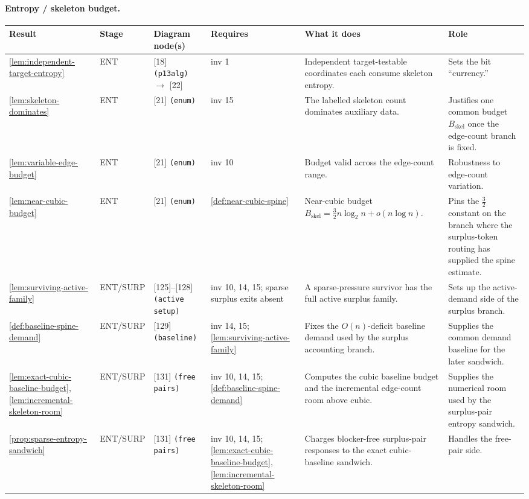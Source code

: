 \documentclass[11pt]{article}
\begin{document}
\paragraph{Entropy / skeleton budget.}
{\scriptsize\setlength{\tabcolsep}{3pt}
\begin{longtable}{L{0.10\textwidth} C{0.045\textwidth} L{0.13\textwidth} L{0.135\textwidth} L{0.28\textwidth} L{0.20\textwidth}}
\toprule
\textbf{Result} & \textbf{Stage} & \textbf{Diagram node(s)} & \textbf{Requires} & \textbf{What it does} & \textbf{Role} \\
\midrule
\endhead
\cref{lem:independent-target-entropy} & ENT & [18] \texttt{(p13alg)} $\to$ [22] & inv 1 & Independent target-testable coordinates each consume skeleton entropy. & Sets the bit ``currency.'' \\
\cref{lem:skeleton-dominates} & ENT & [21] \texttt{(enum)} & inv 15 & The labelled skeleton count dominates auxiliary data. & Justifies one common budget $B_{\mathrm{skel}}$ once the edge-count branch is fixed. \\
\cref{lem:variable-edge-budget} & ENT & [21] \texttt{(enum)} & inv 10 & Budget valid across the edge-count range. & Robustness to edge-count variation. \\
\cref{lem:near-cubic-budget} & ENT & [21] \texttt{(enum)} & \cref{def:near-cubic-spine} & Near-cubic budget $B_{\mathrm{skel}}=\tfrac32 n\log_2 n+o(n\log n)$. & Pins the $\tfrac32$ constant on the branch where the surplus-token routing has supplied the spine estimate. \\
\cref{lem:surviving-active-family} & ENT\slash SURP & [125]--[128] \texttt{(active setup)} & inv 10, 14, 15; sparse surplus exits absent & A sparse-pressure survivor has the full active surplus family. & Sets up the active-demand side of the surplus branch. \\
\cref{def:baseline-spine-demand} & ENT\slash SURP & [129] \texttt{(baseline)} & inv 14, 15; \cref{lem:surviving-active-family} & Fixes the \(O(n)\)-deficit baseline demand used by the surplus accounting branch. & Supplies the common demand baseline for the later sandwich. \\
\cref{lem:exact-cubic-baseline-budget}, \cref{lem:incremental-skeleton-room} & ENT\slash SURP & [131] \texttt{(free pairs)} & inv 10, 14, 15; \cref{def:baseline-spine-demand} & Computes the cubic baseline budget and the incremental edge-count room above cubic. & Supplies the numerical room used by the surplus-pair entropy sandwich. \\
\cref{prop:sparse-entropy-sandwich} & ENT\slash SURP & [131] \texttt{(free pairs)} & inv 10, 14, 15; \cref{lem:exact-cubic-baseline-budget}, \cref{lem:incremental-skeleton-room} & Charges blocker-free surplus-pair responses to the exact cubic-baseline sandwich. & Handles the free-pair side. \\

\end{longtable}}
\end{document}
